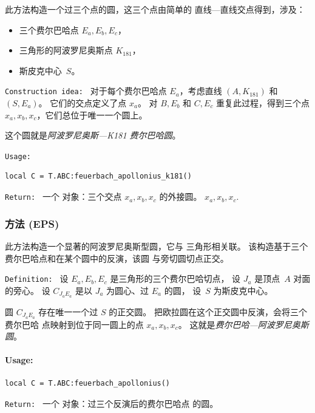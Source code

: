 此方法构造一个过三个点的圆，这三个点由简单的
直线—直线交点得到，涉及：

\begin{itemize}
  \item 三个费尔巴哈点 $E_a,E_b,E_c$，
  \item 三角形的阿波罗尼奥斯点 $K_{181}$，
  \item 斯皮克中心~$S$。
\end{itemize}

\texttt{Construction idea: }
对于每个费尔巴哈点 $E_a$，考虑直线
$(A,K_{181})$ 和 $(S,E_a)$。
它们的交点定义了点 $x_a$。
对 $B,E_b$ 和 $C,E_c$ 重复此过程，得到三个点
$x_a,x_b,x_c$，它们总位于唯一一个圆上。

这个圆就是\emph{阿波罗尼奥斯—K181 费尔巴哈圆}。

\texttt{Usage: }

\begin{verbatim}
local C = T.ABC:feuerbach_apollonius_k181()
\end{verbatim}

\texttt{Return: }
一个  对象：三个交点 $x_a,x_b,x_c$ 的外接圆。
$x_a,x_b,x_c$.



\subsubsection{方法 (EPS)}
\label{ssub:feuerbach_apollonius}

此方法构造一个显著的阿波罗尼奥斯型圆，它与
三角形相关联。
该构造基于三个费尔巴哈点和在某个圆中的反演，该圆
与旁切圆切点正交。

\texttt{Definition: }
设 $E_a,E_b,E_c$ 是三角形的三个费尔巴哈切点，
设 $J_a$ 是顶点~$A$ 对面的旁心。
设 $C_{J_aE_a}$ 是以 $J_a$ 为圆心、过 $E_a$ 的圆，
设~$S$ 为斯皮克中心。

圆 $C_{J_aE_a}$ 存在唯一一个过 $S$ 的正交圆。
把欧拉圆在这个正交圆中反演，会将三个费尔巴哈
点映射到位于同一圆上的点 $x_a,x_b,x_c$。
这就是\emph{费尔巴哈—阿波罗尼奥斯圆}。

\paragraph{Usage: }

\begin{verbatim}
local C = T.ABC:feuerbach_apollonius()
\end{verbatim}

\texttt{Return: }
一个  对象：过三个反演后的费尔巴哈点
的圆。



